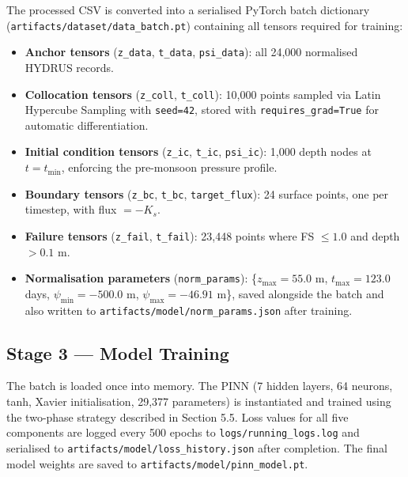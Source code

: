 \documentclass[12pt]{report}
\begin{document}
The processed CSV is converted into a serialised PyTorch batch
dictionary (\texttt{artifacts/dataset/data\_batch.pt}) containing
all tensors required for training:

\begin{itemize}
    \item \textbf{Anchor tensors} (\texttt{z\_data},
    \texttt{t\_data}, \texttt{psi\_data}): all 24,000 normalised
    HYDRUS records.

    \item \textbf{Collocation tensors} (\texttt{z\_coll},
    \texttt{t\_coll}): 10,000 points sampled via Latin Hypercube
    Sampling with \texttt{seed=42}, stored with
    \texttt{requires\_grad=True} for automatic differentiation.

    \item \textbf{Initial condition tensors} (\texttt{z\_ic},
    \texttt{t\_ic}, \texttt{psi\_ic}): 1,000 depth nodes at
    $t = t_{\min}$, enforcing the pre-monsoon pressure profile.

    \item \textbf{Boundary tensors} (\texttt{z\_bc},
    \texttt{t\_bc}, \texttt{target\_flux}): 24 surface points,
    one per timestep, with flux $= -K_s$.

    \item \textbf{Failure tensors} (\texttt{z\_fail},
    \texttt{t\_fail}): 23,448 points where FS $\leq 1.0$ and
    depth $> 0.1$ m.

    \item \textbf{Normalisation parameters}
    (\texttt{norm\_params}): \{$z_{\max}=55.0$ m,
    $t_{\max}=123.0$ days, $\psi_{\min}=-500.0$ m,
    $\psi_{\max}=-46.91$ m\}, saved alongside the batch and also
    written to \texttt{artifacts/model/norm\_params.json} after
    training.
\end{itemize}

\subsection{Stage 3 — Model Training}

The batch is loaded once into memory. The PINN (7 hidden layers,
64 neurons, tanh, Xavier initialisation, 29,377 parameters) is
instantiated and trained using the two-phase strategy described in
Section 5.5. Loss values for all five components are logged every
500 epochs to \texttt{logs/running\_logs.log} and serialised to
\texttt{artifacts/model/loss\_history.json} after completion. The
final model weights are saved to
\texttt{artifacts/model/pinn\_model.pt}.
\end{document}
